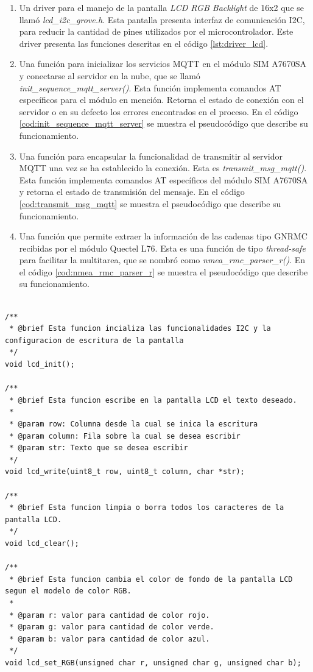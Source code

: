 \begin{enumerate}
	\item Un driver para el manejo de la pantalla \textit{LCD RGB Backlight} de 16x2 que se llamó \textit{lcd\_i2c\_grove.h}. Esta pantalla presenta interfaz de comunicación I2C, para reducir la cantidad de pines utilizados por el microcontrolador. Este driver presenta las funciones descritas en el código \ref{lst:driver_lcd}.
	
	\item Una función para inicializar los servicios MQTT en el módulo SIM A7670SA y conectarse al servidor en la nube, que se llamó \textit{init\_sequence\_mqtt\_server()}. Esta función implementa comandos AT específicos para el módulo en mención. Retorna el estado de conexión con el servidor o en su defecto los errores encontrados en el proceso. En el código \ref{cod:init_sequence_mqtt_server} se muestra el pseudocódigo que describe su funcionamiento.
	
	\item Una función para encapsular la funcionalidad de transmitir al servidor MQTT una vez se ha establecido la conexión. Esta es \textit{transmit\_msg\_mqtt()}. Esta función implementa comandos AT específicos del módulo SIM A7670SA y retorna el estado de transmisión del mensaje. En el código \ref{cod:transmit_msg_mqtt} se muestra el pseudocódigo que describe su funcionamiento.
	
	\item Una función que permite extraer la información de las cadenas tipo GNRMC recibidas por el módulo Quectel L76. Esta es una función de tipo \textit{thread-safe} para facilitar la multitarea, que se nombró como \textit{nmea\_rmc\_parser\_r()}. En el código \ref{cod:nmea_rmc_parser_r} se muestra el pseudocódigo que describe su funcionamiento.
\end{enumerate}


\begin{lstlisting}[label={lst:driver_lcd}, caption={Funciones principales del driver LCD.}] 

/**
 * @brief Esta funcion incializa las funcionalidades I2C y la configuracion de escritura de la pantalla
 */
void lcd_init();

/**
 * @brief Esta funcion escribe en la pantalla LCD el texto deseado.
 * 
 * @param row: Columna desde la cual se inica la escritura
 * @param column: Fila sobre la cual se desea escribir
 * @param str: Texto que se desea escribir
 */
void lcd_write(uint8_t row, uint8_t column, char *str);

/**
 * @brief Esta funcion limpia o borra todos los caracteres de la pantalla LCD.
 */
void lcd_clear();

/**
 * @brief Esta funcion cambia el color de fondo de la pantalla LCD segun el modelo de color RGB.
 * 
 * @param r: valor para cantidad de color rojo.
 * @param g: valor para cantidad de color verde.
 * @param b: valor para cantidad de color azul.
 */
void lcd_set_RGB(unsigned char r, unsigned char g, unsigned char b);

\end{lstlisting}

